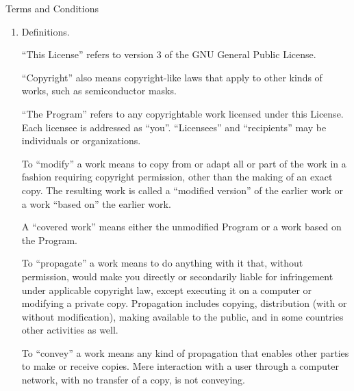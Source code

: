 \documentclass[twocolumn,twoside,fleqn,12pt]{article}
\begin{document}
\begin{abstract}
Finally, every program is threatened constantly by software patents.
States should not allow patents to restrict development and use of
software on general-purpose computers, but in those that do, we wish to
avoid the special danger that patents applied to a free program could
make it effectively proprietary.  To prevent this, the GPL assures that
patents cannot be used to render the program non-free.

The precise terms and conditions for copying, distribution and
modification follow.
\end{abstract}

\begin{center}
{\Large \sc Terms and Conditions}
\end{center}


\begin{enumerate}

\addtocounter{enumi}{-1}

\item Definitions.

``This License'' refers to version 3 of the GNU General Public License.

``Copyright'' also means copyright-like laws that apply to other kinds of
works, such as semiconductor masks.

``The Program'' refers to any copyrightable work licensed under this
License.  Each licensee is addressed as ``you''.  ``Licensees'' and
``recipients'' may be individuals or organizations.

To ``modify'' a work means to copy from or adapt all or part of the work
in a fashion requiring copyright permission, other than the making of an
exact copy.  The resulting work is called a ``modified version'' of the
earlier work or a work ``based on'' the earlier work.

A ``covered work'' means either the unmodified Program or a work based
on the Program.

To ``propagate'' a work means to do anything with it that, without
permission, would make you directly or secondarily liable for
infringement under applicable copyright law, except executing it on a
computer or modifying a private copy.  Propagation includes copying,
distribution (with or without modification), making available to the
public, and in some countries other activities as well.

To ``convey'' a work means any kind of propagation that enables other
parties to make or receive copies.  Mere interaction with a user through
a computer network, with no transfer of a copy, is not conveying.


\end{enumerate}
\end{document}
